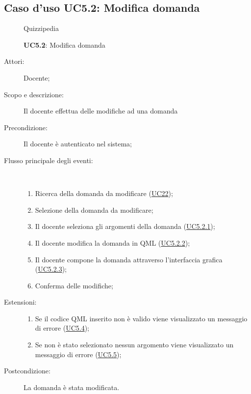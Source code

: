 \subsection{Caso d'uso UC5.2: Modifica domanda}
	\begin{figure}[H]
		\centering
		\begin{resizedtikzpicture}{\textwidth}
		\begin{umlsystem}[x=0, fill=lightgray!20]{Quizzipedia}
		\end{umlsystem}
		\end{resizedtikzpicture}
		\caption{\textbf{UC5.2}: Modifica domanda}
		\label{UC5.2}
	\end{figure}
\begin{description}
\item[Attori:] Docente;
\item[Scopo e descrizione:] Il docente effettua delle modifiche ad una domanda 
      \item[Precondizione:] Il docente è autenticato nel sistema;

        \item[Flusso principale degli eventi:] \ 
 \begin{enumerate}
          \item Ricerca della domanda da modificare (\hyperlink{UC22}{UC22});
          \item Selezione della domanda da modificare;
          \item Il docente seleziona gli argomenti della domanda	 (\hyperlink{UC5.2.1}{UC5.2.1});
          \item Il docente modifica la domanda in QML	 (\hyperlink{UC5.2.2}{UC5.2.2});
          \item Il docente compone la domanda attraverso l'interfaccia grafica (\hyperlink{UC5.2.3}{UC5.2.3});
          \item Conferma delle modifiche;

      \end{enumerate}
    \item[Estensioni:]
      \begin{enumerate}
          \item Se il codice QML inserito non è valido viene visualizzato un messaggio di errore (\hyperlink{UC5.4}{UC5.4});
          \item Se non è stato selezionato nessun argomento viene visualizzato un messaggio di errore (\hyperlink{UC5.5}{UC5.5});

      \end{enumerate}
    \item[Postcondizione:] La domanda è stata modificata.
  \end{description}
\hypertarget{UC5.2.1}{}
